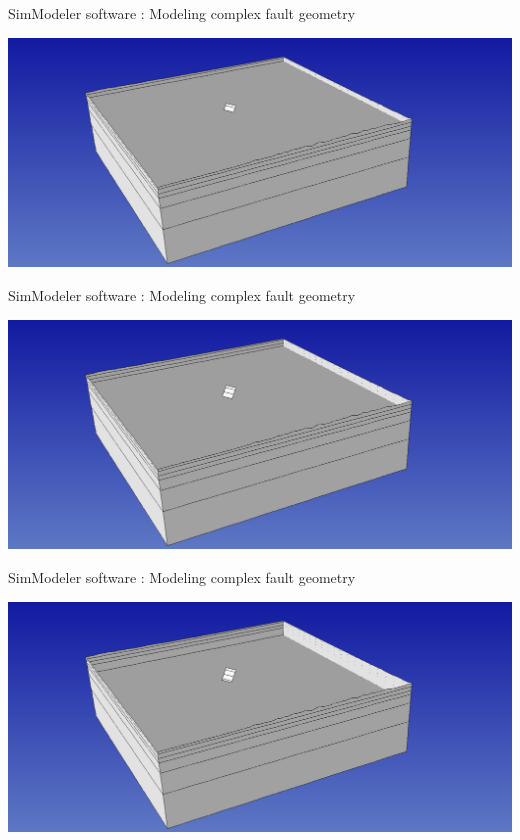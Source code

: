 \documentclass{beamer}
\begin{document}
\begin{frame}
 {SimModeler software : Modeling complex fault geometry}
 
 \includegraphics[width=1\linewidth]{images/simmodeler2}
 
\end{frame}

\begin{frame}
 {SimModeler software : Modeling complex fault geometry}
 
 \includegraphics[width=1\linewidth]{images/simmodeler3}
 
\end{frame}

\begin{frame}
 {SimModeler software : Modeling complex fault geometry}
 
 \includegraphics[width=1\linewidth]{images/simmodeler4}
 
\end{frame}
\end{document}
